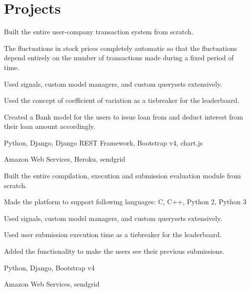 
\section{Projects}

\begin{tightemize}
\item Built the entire user-company transaction system from scratch.
\item The fluctuations in stock prices completely automatic so that the fluctuations depend entirely on the number of transactions made during a fixed period of time.
\item Used signals, custom model managers, and custom querysets extensively.
\item Used the concept of coefficient of variation as a tiebreaker for the leaderboard.
\item Created a Bank model for the users to issue loan from and deduct interest from their loan amount accordingly.
\item {} Python, Django, Django REST Framework, Bootstrap v4, chart.js
\item {} Amazon Web Services, Heroku, sendgrid
\end{tightemize}
\sectionsep

\begin{tightemize}
\item Built the entire compilation, execution and submission evaluation module from scratch.
\item Made the platform to support following languages: C, C++, Python 2, Python 3
\item Used signals, custom model managers, and custom querysets extensively.
\item Used user submission execution time as a tiebreaker for the leaderboard.
\item Added the functionality to make the users see their previous submissions.
\item {} Python, Django, Bootstrap v4
\item {} Amazon Web Services, sendgrid
\end{tightemize}
\sectionsep

